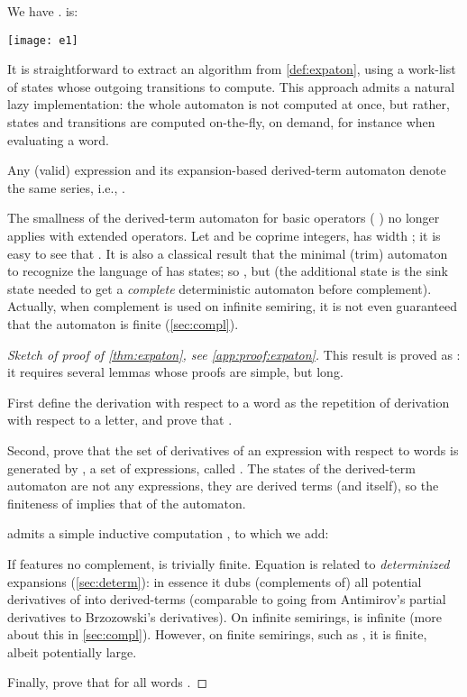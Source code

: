 \documentclass[a4paper,USenglish]{lipics}
\begin{document}
\begin{Example}
  \label{ex:e1:end}
{We have .  is:}

  \centerline{\texttt{[image: e1]}}
\end{Example}

It is straightforward to extract an algorithm from \cref{def:expaton}, using
a work-list of states whose outgoing transitions to compute.  This approach
admits a natural lazy implementation: the whole automaton is not computed at
once, but rather, states and transitions are computed on-the-fly, on demand,
for instance when evaluating a word.

\begin{theorem}
  \label{thm:expaton}Any (valid) expression  and its expansion-based derived-term
  automaton  denote the same series, i.e.,
  .
\end{theorem}

The smallness of the derived-term automaton for basic operators
(
\citep[Theorem~2]{lombardy.2005.tcs}) no longer applies with extended
operators.  Let  and  be coprime integers,
 has width ; it is
easy to see that .  It is also a classical result
that the minimal (trim) automaton to recognize the language of
 has  states; so
, but  (the
additional state is the sink state needed to get a \emph{complete}
deterministic automaton before complement).  Actually, when complement is
used on infinite semiring, it is not even guaranteed that the automaton is
finite (\cref{sec:compl}).

\begin{proof}[Sketch of proof of \cref{thm:expaton}, see \cref{app:proof:expaton}]
  This result is proved as \citep[Theorem~4]{lombardy.2005.tcs}: it requires
  several lemmas whose proofs are simple, but long.

  First define the derivation with respect to a word as the repetition of
  derivation with respect to a letter, and prove that
  .

  Second, prove that the set of derivatives of an expression  with
  respect to words is generated by , a set of expressions, called
  .  The states of the derived-term automaton are not any
  expressions, they are derived terms (and  itself), so the finiteness
  of  implies that of the automaton.

   admits a simple inductive computation \citep[Definition
  3]{lombardy.2005.tcs}, to which we add:
  
  If  features no complement,  is trivially finite.  Equation
   is related to \emph{determinized} expansions
  (\cref{sec:determ}): in essence it dubs (complements of) all potential
  derivatives of  into derived-terms (comparable to going from
  Antimirov's partial derivatives to Brzozowski's derivatives).  On infinite
  semirings,  is infinite (more about this in \cref{sec:compl}).
  However, on finite semirings, such as , it is finite, albeit
  potentially large.

  Finally, prove that  for all words
  .
\end{proof}
\end{document}
